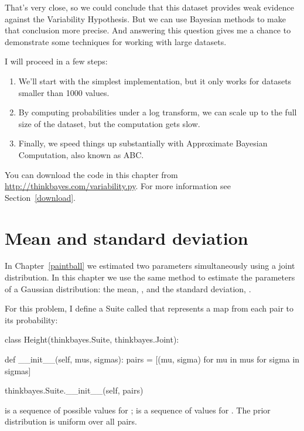 \documentclass[12pt]{book}
\theoremstyle{exercise}
\begin{document}
That's very close, so we could conclude that this dataset provides
weak evidence against the Variability Hypothesis.  But we can use
Bayesian methods to make that conclusion more precise.  And answering
this question gives me a chance to demonstrate some techniques
for working with large datasets.

I will proceed in a few steps:

\begin{enumerate}

\item We'll start with the simplest implementation, but it only works
  for datasets smaller than 1000 values.

\item By computing probabilities under a log transform, we can scale
  up to the full size of the dataset, but the computation gets slow.

\item Finally, we speed things up substantially with Approximate
  Bayesian Computation, also known as ABC.

\end{enumerate}

You can download the code in this chapter from
\url{http://thinkbayes.com/variability.py}.
  For more information
see Section~\ref{download}.

\section{Mean and standard deviation}

In Chapter~\ref{paintball} we estimated two parameters simultaneously
using a joint distribution.  In this chapter we use the same
method to estimate the parameters of a Gaussian distribution:
the mean, , and the standard deviation, .

For this problem, I define a Suite called  that
represents a map from each  pair to its probability:

\begin{code}
class Height(thinkbayes.Suite, thinkbayes.Joint):

    def __init__(self, mus, sigmas):
        pairs = [(mu, sigma) 
                 for mu in mus
                 for sigma in sigmas]

        thinkbayes.Suite.__init__(self, pairs)
\end{code}

 is a sequence of possible values for ; 
is a sequence of values for .  The prior distribution
is uniform over all  pairs.
\end{document}
